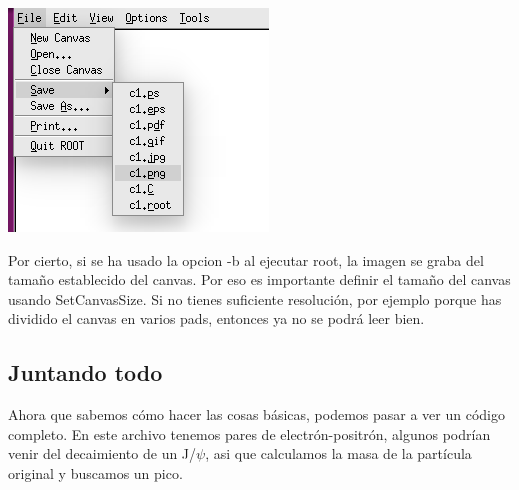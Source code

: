 \documentclass{article}
\begin{document}
\begin{center}
\includegraphics[scale=0.65]{save.png}
\end{center}

Por cierto, si se ha usado la opcion -b al ejecutar root, la imagen se graba del tamaño establecido del canvas. Por eso es importante definir el tamaño del canvas usando SetCanvasSize. Si no tienes suficiente resoluci\'on, por ejemplo porque has dividido el canvas en varios pads, entonces ya no se podr\'a leer bien.


\subsection{Juntando todo}
\par
Ahora que sabemos c\'omo hacer las cosas b\'asicas, podemos pasar a ver un c\'odigo completo. En este archivo tenemos pares de electr\'on-positr\'on, algunos podr\'ian venir del decaimiento de un J/$\psi$, asi que calculamos la masa de la part\'icula original y buscamos un pico.
\end{document}
